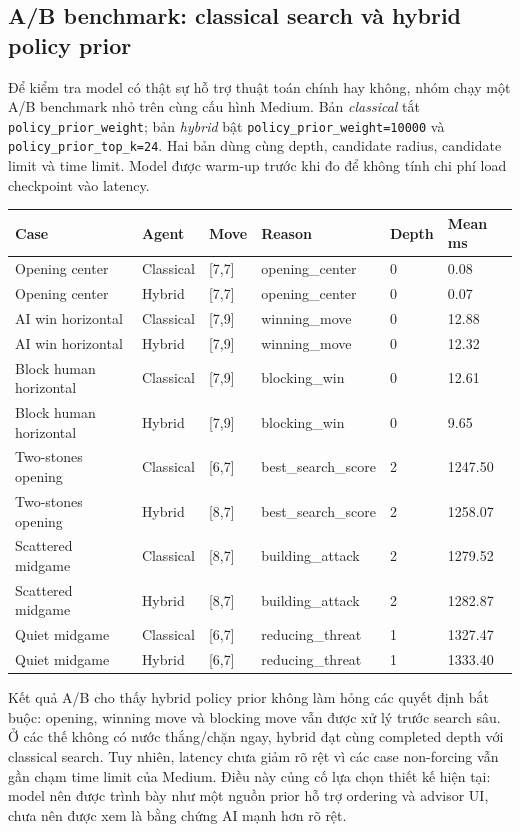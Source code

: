 \documentclass[12pt,a4paper]{article}
\begin{document}
\subsection{A/B benchmark: classical search và hybrid policy prior}

Để kiểm tra model có thật sự hỗ trợ thuật toán chính hay không, nhóm chạy một A/B benchmark nhỏ trên cùng cấu hình Medium. Bản \textit{classical} tắt \texttt{policy\_prior\_weight}; bản \textit{hybrid} bật \texttt{policy\_prior\_weight=10000} và \texttt{policy\_prior\_top\_k=24}. Hai bản dùng cùng depth, candidate radius, candidate limit và time limit. Model được warm-up trước khi đo để không tính chi phí load checkpoint vào latency.

\begin{longtable}{p{}p{}p{}p{}p{}p{}}
\toprule
\textbf{Case} & \textbf{Agent} & \textbf{Move} & \textbf{Reason} & \textbf{Depth} & \textbf{Mean ms} \\
\midrule
Opening center & Classical & [7,7] & opening\_center & 0 & 0.08 \\
Opening center & Hybrid & [7,7] & opening\_center & 0 & 0.07 \\
AI win horizontal & Classical & [7,9] & winning\_move & 0 & 12.88 \\
AI win horizontal & Hybrid & [7,9] & winning\_move & 0 & 12.32 \\
Block human horizontal & Classical & [7,9] & blocking\_win & 0 & 12.61 \\
Block human horizontal & Hybrid & [7,9] & blocking\_win & 0 & 9.65 \\
Two-stones opening & Classical & [6,7] & best\_search\_score & 2 & 1247.50 \\
Two-stones opening & Hybrid & [8,7] & best\_search\_score & 2 & 1258.07 \\
Scattered midgame & Classical & [8,7] & building\_attack & 2 & 1279.52 \\
Scattered midgame & Hybrid & [8,7] & building\_attack & 2 & 1282.87 \\
Quiet midgame & Classical & [6,7] & reducing\_threat & 1 & 1327.47 \\
Quiet midgame & Hybrid & [6,7] & reducing\_threat & 1 & 1333.40 \\
\bottomrule
\end{longtable}

Kết quả A/B cho thấy hybrid policy prior không làm hỏng các quyết định bắt buộc: opening, winning move và blocking move vẫn được xử lý trước search sâu. Ở các thế không có nước thắng/chặn ngay, hybrid đạt cùng completed depth với classical search. Tuy nhiên, latency chưa giảm rõ rệt vì các case non-forcing vẫn gần chạm time limit của Medium. Điều này củng cố lựa chọn thiết kế hiện tại: model nên được trình bày như một nguồn prior hỗ trợ ordering và advisor UI, chưa nên được xem là bằng chứng AI mạnh hơn rõ rệt.
\end{document}
